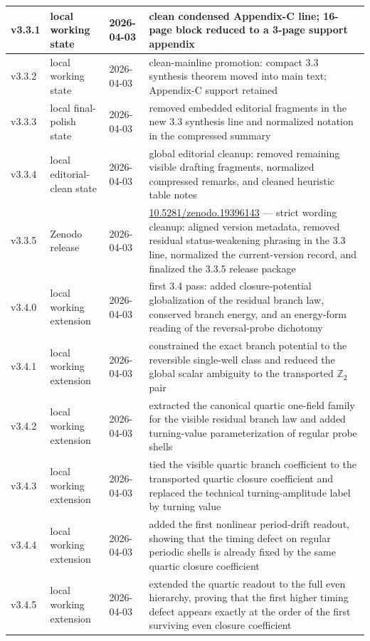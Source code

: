 {\begin{longtable}{|p{}|p{}|p{}|p{}|}
\hline
v3.3.1 & local working state & 2026-04-03 & clean condensed Appendix-C line; 16-page block reduced to a 3-page support appendix \\
\hline
v3.3.2 & local working state & 2026-04-03 & clean-mainline promotion: compact 3.3 synthesis theorem moved into main text; Appendix-C support retained \\
\hline
v3.3.3 & local final-polish state & 2026-04-03 & removed embedded editorial fragments in the new 3.3 synthesis line and normalized notation in the compressed summary \\
\hline
v3.3.4 & local editorial-clean state & 2026-04-03 & global editorial cleanup: removed remaining visible drafting fragments, normalized compressed remarks, and cleaned heuristic table notes \\
\hline
v3.3.5 & Zenodo release & 2026-04-03 & \href{https://doi.org/10.5281/zenodo.19396143}{10.5281/zenodo.19396143} --- strict wording cleanup: aligned version metadata, removed residual status-weakening phrasing in the 3.3 line, normalized the current-version record, and finalized the 3.3.5 release package \\
\hline
v3.4.0 & local working extension & 2026-04-03 & first 3.4 pass: added closure-potential globalization of the residual branch law, conserved branch energy, and an energy-form reading of the reversal-probe dichotomy \\
\hline
v3.4.1 & local working extension & 2026-04-03 & constrained the exact branch potential to the reversible single-well class and reduced the global scalar ambiguity to the transported $\mathbb Z_2$ pair \\
\hline
v3.4.2 & local working extension & 2026-04-03 & extracted the canonical quartic one-field family for the visible residual branch law and added turning-value parameterization of regular probe shells \\
\hline
v3.4.3 & local working extension & 2026-04-03 & tied the visible quartic branch coefficient to the transported quartic closure coefficient and replaced the technical turning-amplitude label by turning value \\
\hline
v3.4.4 & local working extension & 2026-04-03 & added the first nonlinear period-drift readout, showing that the timing defect on regular periodic shells is already fixed by the same quartic closure coefficient \\
\hline
v3.4.5 & local working extension & 2026-04-03 & extended the quartic readout to the full even hierarchy, proving that the first higher timing defect appears exactly at the order of the first surviving even closure coefficient \\

\end{longtable}}
